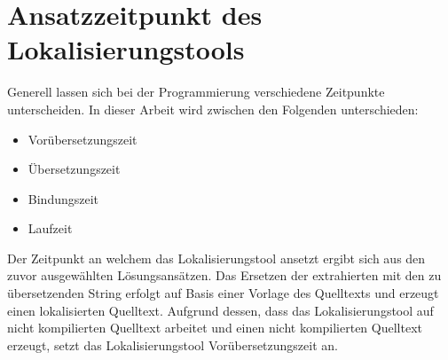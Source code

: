 \chapter{Ansatzzeitpunkt des Lokalisierungstools}
Generell lassen sich bei der Programmierung verschiedene Zeitpunkte unterscheiden. In dieser Arbeit wird zwischen den Folgenden unterschieden:
\begin{itemize}
	\item Vorübersetzungszeit
	\item Übersetzungszeit
	\item Bindungszeit
	\autocite[Vgl.][S. 155]{Presser.1972}
	\item Laufzeit
\end{itemize}
Der Zeitpunkt an welchem das Lokalisierungstool ansetzt ergibt sich aus den zuvor ausgewählten Lösungsansätzen. Das Ersetzen der extrahierten mit den zu übersetzenden String erfolgt auf Basis einer Vorlage des Quelltexts und erzeugt einen lokalisierten Quelltext. Aufgrund dessen, dass das Lokalisierungstool auf nicht kompilierten Quelltext arbeitet und einen nicht kompilierten Quelltext erzeugt, setzt das Lokalisierungstool Vorübersetzungszeit an.
